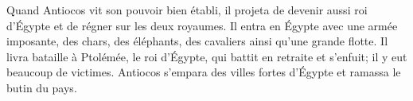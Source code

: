 Quand Antiocos vit son pouvoir bien établi,
	il projeta de devenir aussi roi d’Égypte et de régner sur les deux royaumes.
Il entra en Égypte avec une armée imposante,
	des chars, des éléphants, des cavaliers ainsi qu’une grande flotte.
Il livra bataille à Ptolémée, le roi d’Égypte, qui battit en retraite et s’enfuit;
	il y eut beaucoup de victimes.
Antiocos s’empara des villes fortes d’Égypte et ramassa le butin du pays.
